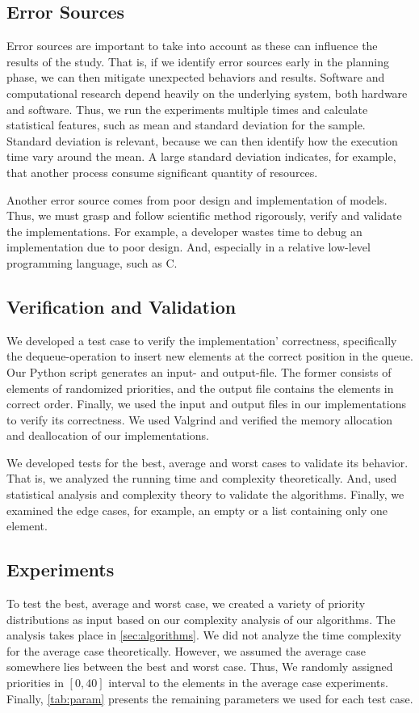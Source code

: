 \documentclass[a4paper,11pt]{kth-mag}
\newcommand*{\skippara}{\par\vspace{\baselineskip} \noindent}
\begin{document}
\subsection{Error Sources} Error sources are important to take into account as these can influence the results of the study.
That is, if we identify error sources early in the planning phase, we can then mitigate unexpected behaviors and results.
Software and computational research depend heavily on the underlying system, both hardware and software.
Thus, we run the experiments multiple times and calculate statistical features, such as mean and standard deviation for the sample.
Standard deviation is relevant, because we can then identify how the execution time vary around the mean.
A large standard deviation indicates, for example, that another process consume significant quantity of resources.

\skippara Another error source comes from poor design and implementation of models.
Thus, we must grasp and follow scientific method rigorously, verify and validate the implementations.
For example, a developer wastes time to debug an implementation due to poor design.
And, especially in a relative low-level programming language, such as C.

\subsection{Verification and Validation}
We developed a test case to verify the implementation' correctness, specifically the dequeue-operation to insert new elements at the correct position in the queue.
Our Python script generates an input- and output-file.
The former consists of elements of randomized priorities, and the output file contains the elements in correct order.
Finally, we used the input and output files in our implementations to verify its correctness.
We used Valgrind and verified the memory allocation and deallocation of our implementations.

\skippara We developed tests for the best, average and worst cases to validate its behavior.
That is, we analyzed the running time and complexity theoretically.
And, used statistical analysis and complexity theory to validate the algorithms.
Finally, we examined the edge cases, for example, an empty or a list containing only one element.

\subsection{Experiments}
To test the best, average and worst case, we created a variety of priority distributions as input based on our complexity analysis of our algorithms.
The analysis takes place in \cref{sec:algorithms}.
We did not analyze the time complexity for the average case theoretically.
However, we assumed the average case somewhere lies between the best and worst case.
Thus, We randomly assigned priorities in $[0,40]$ interval to the elements in the average case experiments.
Finally, \cref{tab:param} presents the remaining parameters we used for each test case.
\end{document}
